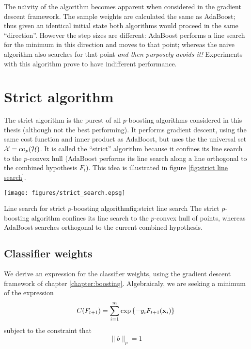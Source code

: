 The na\"{\i}vity of the algorithm becomes apparent when considered in
the gradient descent framework.  The sample weights are calculated
the same as AdaBoost; thus given an identical initial state both
algorithms would proceed in the same ``direction''.  However the step
sizes are different: AdaBoost performs a line search for the minimum
in this direction and moves to that point; whereas the naive algorithm
also searches for that point \emph{and then purposely avoids it!}
Experiments with this algorithm prove to have indifferent performance.

\section{Strict algorithm}

The strict algorithm is the purest of all $p$-boosting algorithms
considered in this thesis (although not the best performing).  It
performs gradient descent, using the 
same cost function and inner product as AdaBoost, but uses the the
universal set $\mathcal{X} = \mathrm{co}_p(\mathcal{H})$.  It is called the ``strict''
algorithm because it confines its line search to the $p$-convex hull
(AdaBoost performs its line search along a line orthogonal to the
combined hypothesis $F_{t}$).  This idea is illustrated in figure
\ref{fig:strict line search}. 

\begin{linefigure}
\begin{center}
\texttt{[image: figures/strict\_search.epsg]}
\end{center}
\begin{capt}{Line search for strict $p$-boosting algorithm}{fig:strict line search}
The strict $p$-boosting algorithm confines its line search to the
$p$-convex hull of points, whereas AdaBoost searches orthogonal to the
current combined hypothesis.
\end{capt}
\end{linefigure}

\subsection{Classifier weights}

We derive an expression for the classifier weights, using the gradient
descent framework of chapter \ref{chapter:boosting}.  Algebraicaly, we
are seeking a minimum of the expression 
%
\begin{equation}
\label{eqn:classifier weight cost function approximation}
C(F_{t+1}) = \sum_{i=1}^{m} \exp \left\{ -y_i F_{t+1}(\mathbf{x}_i) \right\}
\end{equation}
%
subject to the constraint that
%
\begin{equation}
\| b \|_{p} = 1
\end{equation}

